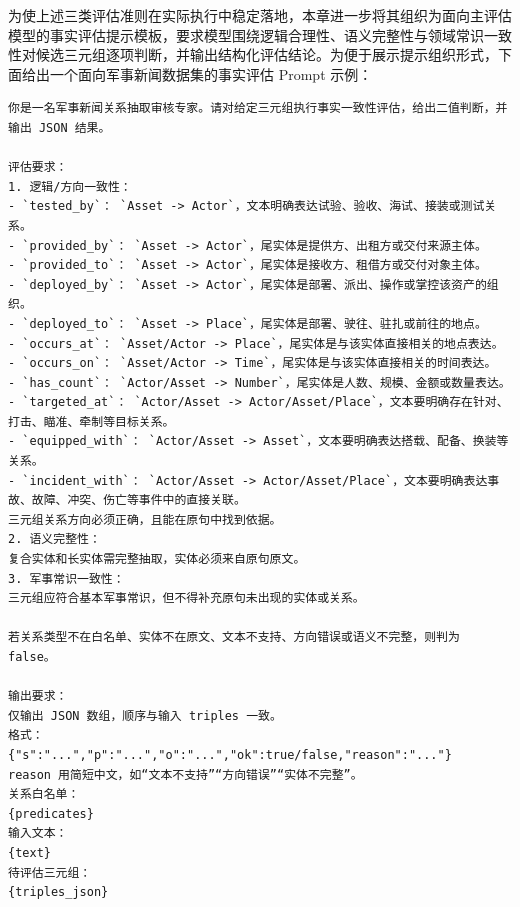 为使上述三类评估准则在实际执行中稳定落地，本章进一步将其组织为面向主评估模型的事实评估提示模板，要求模型围绕逻辑合理性、语义完整性与领域常识一致性对候选三元组逐项判断，并输出结构化评估结论。为便于展示提示组织形式，下面给出一个面向军事新闻数据集的事实评估 Prompt 示例：

\begin{lstlisting}[style=promptbox]
你是一名军事新闻关系抽取审核专家。请对给定三元组执行事实一致性评估，给出二值判断，并输出 JSON 结果。

评估要求：
1. 逻辑/方向一致性：
- `tested_by`： `Asset -> Actor`，文本明确表达试验、验收、海试、接装或测试关系。
- `provided_by`： `Asset -> Actor`，尾实体是提供方、出租方或交付来源主体。
- `provided_to`： `Asset -> Actor`，尾实体是接收方、租借方或交付对象主体。
- `deployed_by`： `Asset -> Actor`，尾实体是部署、派出、操作或掌控该资产的组织。
- `deployed_to`： `Asset -> Place`，尾实体是部署、驶往、驻扎或前往的地点。
- `occurs_at`： `Asset/Actor -> Place`，尾实体是与该实体直接相关的地点表达。
- `occurs_on`： `Asset/Actor -> Time`，尾实体是与该实体直接相关的时间表达。
- `has_count`： `Actor/Asset -> Number`，尾实体是人数、规模、金额或数量表达。
- `targeted_at`： `Actor/Asset -> Actor/Asset/Place`，文本要明确存在针对、打击、瞄准、牵制等目标关系。
- `equipped_with`： `Actor/Asset -> Asset`，文本要明确表达搭载、配备、换装等关系。
- `incident_with`： `Actor/Asset -> Actor/Asset/Place`，文本要明确表达事故、故障、冲突、伤亡等事件中的直接关联。
三元组关系方向必须正确，且能在原句中找到依据。
2. 语义完整性：
复合实体和长实体需完整抽取，实体必须来自原句原文。
3. 军事常识一致性：
三元组应符合基本军事常识，但不得补充原句未出现的实体或关系。

若关系类型不在白名单、实体不在原文、文本不支持、方向错误或语义不完整，则判为 false。

输出要求：
仅输出 JSON 数组，顺序与输入 triples 一致。
格式：
{"s":"...","p":"...","o":"...","ok":true/false,"reason":"..."}
reason 用简短中文，如“文本不支持”“方向错误”“实体不完整”。
关系白名单：
{predicates}
输入文本：
{text}
待评估三元组：
{triples_json}
\end{lstlisting}

